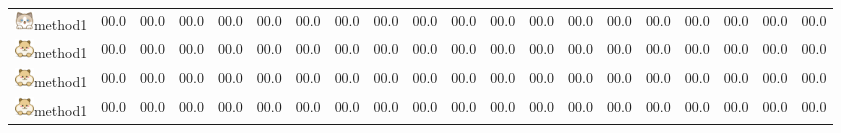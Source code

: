 \documentclass[letterpaper]{article} %
\begin{document}
\begin{table}[ht!]
{\begin{tabular}{ccccc ccccc ccccc  ccccc}
        \includegraphics[width=0.5cm]{image/cat.png}method1  &\cellcolor{color1} 00.0 &\cellcolor{color1} 00.0 &\cellcolor{color2} 00.0 &\cellcolor{color1} 00.0 &\cellcolor{color3} 00.0 &\cellcolor{color1} 00.0 &\cellcolor{color1} 00.0 &\cellcolor{color1} 00.0 &\cellcolor{color1} 00.0 &\cellcolor{color1} 00.0 &\cellcolor{color1} 00.0 &\cellcolor{color1} 00.0
    &\cellcolor{color1} 00.0 &\cellcolor{color1} 00.0 &\cellcolor{color1} 00.0 &\cellcolor{color1} 00.0 &\cellcolor{color1} 00.0 &\cellcolor{color1} 00.0 &\cellcolor{color1} 00.0\\
        \includegraphics[width=0.5cm]{image/mouse.png}method1  &\cellcolor{color1} 00.0 &\cellcolor{color1} 00.0 &\cellcolor{color2} 00.0 &\cellcolor{color1} 00.0 &\cellcolor{color3} 00.0 &\cellcolor{color1} 00.0 &\cellcolor{color1} 00.0 &\cellcolor{color1} 00.0 &\cellcolor{color1} 00.0 &\cellcolor{color1} 00.0 &\cellcolor{color1} 00.0 &\cellcolor{color1} 00.0
    &\cellcolor{color1} 00.0 &\cellcolor{color1} 00.0 &\cellcolor{color1} 00.0 &\cellcolor{color1} 00.0 &\cellcolor{color1} 00.0 &\cellcolor{color1} 00.0 &\cellcolor{color1} 00.0\\
    \includegraphics[width=0.5cm]{image/mouse.png}method1  &\cellcolor{color1} 00.0 &\cellcolor{color1} 00.0 &\cellcolor{color2} 00.0 &\cellcolor{color1} 00.0 &\cellcolor{color3} 00.0 &\cellcolor{color1} 00.0 &\cellcolor{color1} 00.0 &\cellcolor{color1} 00.0 &\cellcolor{color1} 00.0 &\cellcolor{color3} 00.0 &\cellcolor{color3} 00.0 &\cellcolor{color1} 00.0
    &\cellcolor{color1} 00.0 &\cellcolor{color1} 00.0 &\cellcolor{color1} 00.0 &\cellcolor{color1} 00.0 &\cellcolor{color1} 00.0 &\cellcolor{color1} 00.0 &\cellcolor{color1} 00.0\\
        \includegraphics[width=0.5cm]{image/mouse.png}method1  &\cellcolor{color1} 00.0 &\cellcolor{color1} 00.0 &\cellcolor{color1} 00.0 &\cellcolor{color1} 00.0 &\cellcolor{color1} 00.0 &\cellcolor{color1} 00.0 &\cellcolor{color1} 00.0 &\cellcolor{color1} 00.0 &\cellcolor{color2} 00.0 &\cellcolor{color2} 00.0 &\cellcolor{color2} 00.0 &\cellcolor{color1} 00.0
    &\cellcolor{color1} 00.0 &\cellcolor{color1} 00.0 &\cellcolor{color1} 00.0 &\cellcolor{color1} 00.0 &\cellcolor{color1} 00.0 &\cellcolor{color1} 00.0 &\cellcolor{color1} 00.0\\

\end{tabular}}
\end{table}
\end{document}
